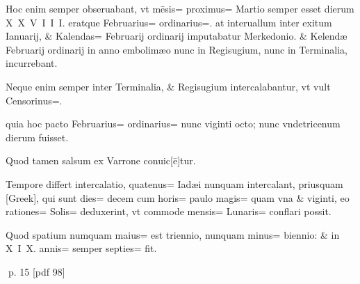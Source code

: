 \begin{parnumbers}
Hoc enim semper obseruabant, vt mēsis= proximus= Martio semper esset dierum X X V I I I. eratque Februarius= ordinarius=. at interuallum inter exitum Ianuarij, \& Kalendas= Februarij ordinarij imputabatur Merkedonio. \& Kelendæ Februarij ordinarij in anno embolimæo nunc in Regisugium, nunc in Terminalia, incurrebant.

Neque enim semper inter Terminalia, \& Regisugium intercalabantur, vt vult Censorinus=. 

quia hoc pacto Februarius= ordinarius= nunc viginti octo; nunc vndetricenum dierum fuisset.

Quod tamen salsum ex Varrone conuic[ē]tur.

Tempore differt intercalatio, quatenus= Iadæi nunquam intercalant, priusquam [Greek], qui sunt dies= decem cum horis= paulo magis= quam vna \& viginti, eo rationes= Solis= deduxerint, vt commode mensis= Lunaris= conflari possit.

Quod spatium numquam maius= est triennio, nunquam minus= biennio: \& in X I X. annis= semper septies= fit.

\end{parnumbers}
\clearpage
p. 15 [pdf 98]

